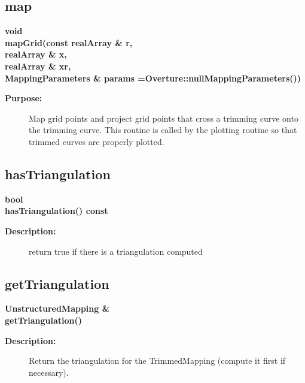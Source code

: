 \subsection{map}
 
\begin{flushleft} \textbf{%
void   \\ 
\settowidth{\TrimmedMappingIncludeArgIndent}{mapGrid(}%
mapGrid(const realArray \& r, \\ 
\hspace{\TrimmedMappingIncludeArgIndent}realArray \& x, \\ 
\hspace{\TrimmedMappingIncludeArgIndent}realArray \& xr,\\ 
MappingParameters \& params  =Overture::nullMappingParameters())
}\end{flushleft}
\begin{description}
\item[{\bf Purpose:}]  Map grid points and project grid points that cross a trimming curve
    onto the trimming curve.  This routine is called by the plotting routine
    so that trimmed curves are properly plotted.
\end{description}
\subsection{hasTriangulation}
 
\begin{flushleft} \textbf{%
bool  \\ 
\settowidth{\TrimmedMappingIncludeArgIndent}{hasTriangulation(}%
hasTriangulation() const
}\end{flushleft}
\begin{description}
\item[{\bf Description:}] 
 return true if there is a triangulation computed
\end{description}
\subsection{getTriangulation}
 
\begin{flushleft} \textbf{%
UnstructuredMapping \&  \\ 
\settowidth{\TrimmedMappingIncludeArgIndent}{getTriangulation(}%
getTriangulation()
}\end{flushleft}
\begin{description}
\item[{\bf Description:}] 
    Return the triangulation for the TrimmedMapping (compute it first if necessary).
\end{description}

